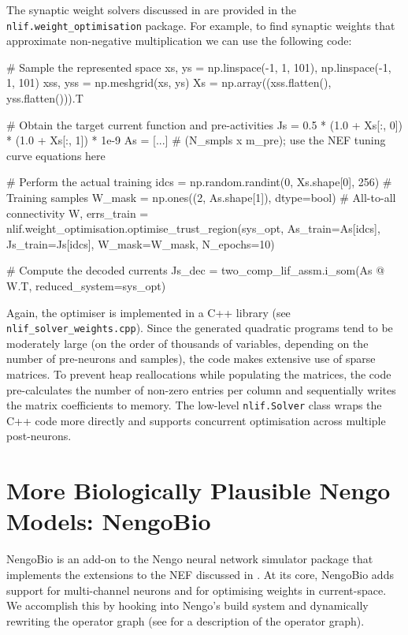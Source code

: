 The synaptic weight solvers discussed in  are provided in the \texttt{nlif.weight\_optimisation} package.
For example, to find synaptic weights that approximate non-negative multiplication we can use the following code:
\begin{pythoncode}
# Sample the represented space
xs, ys = np.linspace(-1, 1, 101), np.linspace(-1, 1, 101)
xss, yss = np.meshgrid(xs, ys)
Xs = np.array((xss.flatten(), yss.flatten())).T

# Obtain the target current function and pre-activities
Js = 0.5 * (1.0 + Xs[:, 0]) * (1.0 + Xs[:, 1]) * 1e-9
As = [...] # (N_smpls x m_pre); use the NEF tuning curve equations here

# Perform the actual training
idcs = np.random.randint(0, Xs.shape[0], 256)  # Training samples
W_mask = np.ones((2, As.shape[1]), dtype=bool) # All-to-all connectivity
W, errs_train = nlif.weight_optimisation.optimise_trust_region(sys_opt,
    As_train=As[idcs], Js_train=Js[idcs], W_mask=W_mask, N_epochs=10)

# Compute the decoded currents
Js_dec = two_comp_lif_assm.i_som(As @ W.T, reduced_system=sys_opt)
\end{pythoncode}
Again, the optimiser is implemented in a C++ library (see \texttt{nlif\_solver\_weights.cpp}).
Since the generated quadratic programs tend to be moderately large (on the order of thousands of variables, depending on the number of pre-neurons and samples), the code makes extensive use of sparse matrices.
To prevent heap reallocations while populating the matrices, the code pre-calculates the number of non-zero entries per column and sequentially writes the matrix coefficients to memory.
The low-level \texttt{nlif.Solver} class wraps the C++ code more directly and supports concurrent optimisation across multiple post-neurons.

\section{More Biologically Plausible Nengo Models: NengoBio}
\label{app:nengo_bio}

NengoBio is an add-on to the Nengo neural network simulator package \citep{bekolay2014nengo} that implements the extensions to the NEF discussed in .
At its core, NengoBio adds support for multi-channel neurons and for optimising weights in current-space.
We accomplish this by hooking into Nengo's build system and dynamically rewriting the operator graph (see \cite{gosmann2017automatic} for a description of the operator graph).

